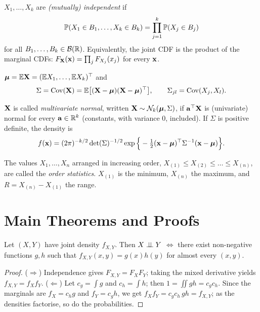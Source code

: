 \documentclass[main.tex]{subfiles}
\begin{document}
\begin{definition}\label{def:rd-bagimsiz}
$X_1,\dots,X_k$ are \emph{(mutually) independent} if
\[
\P(X_1\in B_1,\dots,X_k\in B_k)=\prod_{j=1}^k\P(X_j\in B_j)
\]
for all $B_1,\dots,B_k\in\B(\R)$. Equivalently, the joint CDF is the product of the marginal CDFs: $F_{\X}(\x)=\prod_jF_{X_j}(x_j)$ for every $\x$.
\end{definition}

\begin{definition}
$\bm\mu=\E\X=(\E X_1,\dots,\E X_k)^\top$ and
\[
\Sigma=\Cov(\X)=\E\big[(\X-\bm\mu)(\X-\bm\mu)^\top\big],\qquad\Sigma_{jl}=\Cov(X_j,X_l).
\]
\end{definition}

\begin{definition}\label{def:mvn}
$\X$ is called \emph{multivariate normal}, written $\X\sim\Normal_k(\bm\mu,\Sigma)$, if $\mathbf a^\top\X$ is (univariate) normal for every $\mathbf a\in\R^k$ (constants, with variance $0$, included). If $\Sigma$ is positive definite, the density is
\[
f(\x)=(2\pi)^{-k/2}\det(\Sigma)^{-1/2}\exp\Big\{-\tfrac12(\x-\bm\mu)^\top\Sigma^{-1}(\x-\bm\mu)\Big\}.
\]
\end{definition}

\begin{definition}
The values $X_1,\dots,X_n$ arranged in increasing order, $X_{(1)}\le X_{(2)}\le\dots\le X_{(n)}$, are called the \emph{order statistics}. $X_{(1)}$ is the minimum, $X_{(n)}$ the maximum, and $R=X_{(n)}-X_{(1)}$ the range.
\end{definition}

\section{Main Theorems and Proofs}

\begin{theorem}\label{thm:bagimsiz-carpan}
Let $(X,Y)$ have joint density $f_{X,Y}$. Then $X\indep Y$ $\iff$ there exist non-negative functions $g,h$ such that $f_{X,Y}(x,y)=g(x)h(y)$ for almost every $(x,y)$.
\end{theorem}
\begin{proof}
($\Rightarrow$) Independence gives $F_{X,Y}=F_XF_Y$; taking the mixed derivative yields $f_{X,Y}=f_Xf_Y$.
($\Leftarrow$) Let $c_g=\int g$ and $c_h=\int h$; then $1=\iint gh=c_gc_h$. Since the marginals are $f_X=c_hg$ and $f_Y=c_gh$, we get $f_Xf_Y=c_gc_h\,gh=f_{X,Y}$; as the densities factorise, so do the probabilities.
\end{proof}
\end{document}
